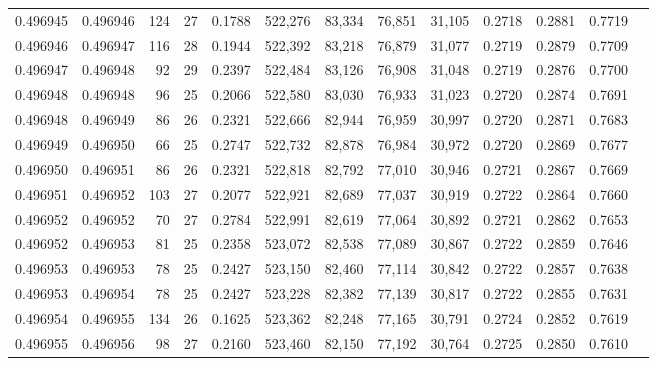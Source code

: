 \begin{tabular}{rrrrrrrrrrrrr}
0.496945 & 0.496946 & 124 &  27 &                                     0.1788 & 522,276 &  83,334 &  76,851 &  31,105 & 0.2718 & 0.2881 & 0.7719 \\
0.496946 & 0.496947 & 116 &  28 &                                     0.1944 & 522,392 &  83,218 &  76,879 &  31,077 & 0.2719 & 0.2879 & 0.7709 \\
0.496947 & 0.496948 &  92 &  29 &                                     0.2397 & 522,484 &  83,126 &  76,908 &  31,048 & 0.2719 & 0.2876 & 0.7700 \\
0.496948 & 0.496948 &  96 &  25 &                                     0.2066 & 522,580 &  83,030 &  76,933 &  31,023 & 0.2720 & 0.2874 & 0.7691 \\
0.496948 & 0.496949 &  86 &  26 &                                     0.2321 & 522,666 &  82,944 &  76,959 &  30,997 & 0.2720 & 0.2871 & 0.7683 \\
0.496949 & 0.496950 &  66 &  25 &                                     0.2747 & 522,732 &  82,878 &  76,984 &  30,972 & 0.2720 & 0.2869 & 0.7677 \\
0.496950 & 0.496951 &  86 &  26 &                                     0.2321 & 522,818 &  82,792 &  77,010 &  30,946 & 0.2721 & 0.2867 & 0.7669 \\
0.496951 & 0.496952 & 103 &  27 &                                     0.2077 & 522,921 &  82,689 &  77,037 &  30,919 & 0.2722 & 0.2864 & 0.7660 \\
0.496952 & 0.496952 &  70 &  27 &                                     0.2784 & 522,991 &  82,619 &  77,064 &  30,892 & 0.2721 & 0.2862 & 0.7653 \\
0.496952 & 0.496953 &  81 &  25 &                                     0.2358 & 523,072 &  82,538 &  77,089 &  30,867 & 0.2722 & 0.2859 & 0.7646 \\
0.496953 & 0.496953 &  78 &  25 &                                     0.2427 & 523,150 &  82,460 &  77,114 &  30,842 & 0.2722 & 0.2857 & 0.7638 \\
0.496953 & 0.496954 &  78 &  25 &                                     0.2427 & 523,228 &  82,382 &  77,139 &  30,817 & 0.2722 & 0.2855 & 0.7631 \\
0.496954 & 0.496955 & 134 &  26 &                                     0.1625 & 523,362 &  82,248 &  77,165 &  30,791 & 0.2724 & 0.2852 & 0.7619 \\
0.496955 & 0.496956 &  98 &  27 &                                     0.2160 & 523,460 &  82,150 &  77,192 &  30,764 & 0.2725 & 0.2850 & 0.7610 \\

\end{tabular}
